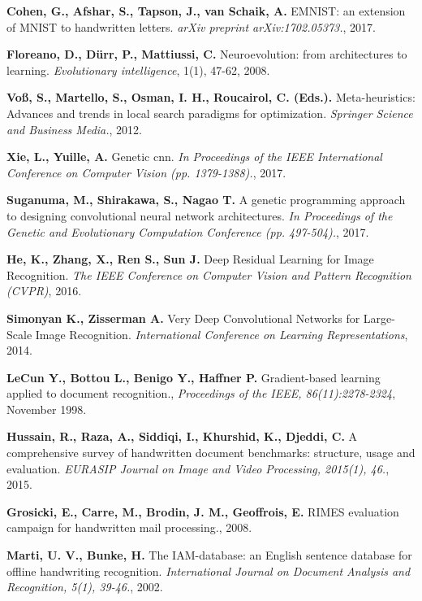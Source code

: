 \documentclass[eng]{simposium}
\begin{document}
\begin{thebibliography}{99}
\textbf{Cohen, G., Afshar, S., Tapson, J., van Schaik, A.} EMNIST: an extension of MNIST to handwritten letters. \emph{arXiv preprint arXiv:1702.05373.}, 2017.

\textbf{Floreano, D., Dürr, P., Mattiussi, C.} Neuroevolution: from architectures to learning. \emph{Evolutionary intelligence}, 1(1), 47-62, 2008.

\textbf{Voß, S., Martello, S., Osman, I. H., Roucairol, C. (Eds.).} Meta-heuristics: Advances and trends in local search paradigms for optimization. \emph{Springer Science and Business Media.}, 2012.

\textbf{Xie, L., Yuille, A. } Genetic cnn. \emph{In Proceedings of the IEEE International Conference on Computer Vision (pp. 1379-1388).}, 2017.

\textbf{Suganuma, M., Shirakawa, S., Nagao T. } A genetic programming approach to designing convolutional neural network architectures. \emph{In Proceedings of the Genetic and Evolutionary Computation Conference (pp. 497-504).}, 2017.

\textbf{He, K., Zhang, X., Ren S., Sun J.} Deep Residual Learning for Image Recognition. \emph{The IEEE Conference on Computer Vision and Pattern Recognition (CVPR)}, 2016.

\textbf{Simonyan K., Zisserman A.} Very Deep Convolutional Networks for Large-Scale Image Recognition. \emph{International Conference on Learning Representations}, 2014.

\textbf{LeCun Y., Bottou L., Benigo Y., Haffner P.} Gradient-based learning applied to document recognition., \emph{Proceedings of the IEEE, 86(11):2278-2324}, November 1998.

\textbf{Hussain, R., Raza, A., Siddiqi, I., Khurshid, K., Djeddi, C.} A comprehensive survey of handwritten document benchmarks: structure, usage and evaluation. \emph{EURASIP Journal on Image and Video Processing, 2015(1), 46.}, 2015.

\textbf{Grosicki, E., Carre, M., Brodin, J. M., Geoffrois, E.} RIMES evaluation campaign for handwritten mail processing., 2008.

\textbf{Marti, U. V., Bunke, H.} The IAM-database: an English sentence database for offline handwriting recognition. \emph{International Journal on Document Analysis and Recognition, 5(1), 39-46.}, 2002.


\end{thebibliography}
\end{document}
